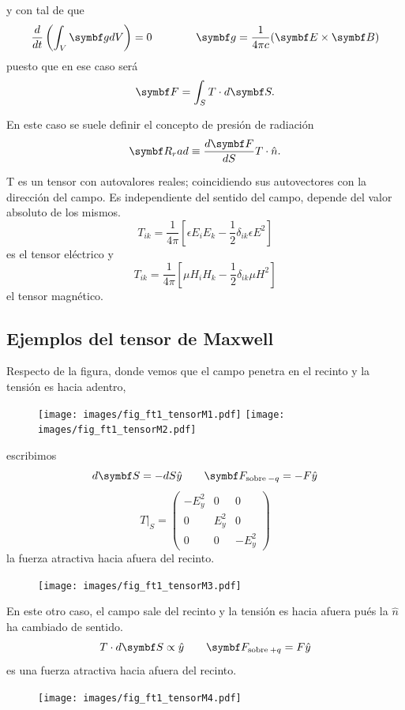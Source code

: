 \documentclass[10pt,oneside]{CBFT_book}
\begin{document}
y con tal de que 
\[
	\dtot{}{t}\left(\int_V \vb{g} dV \right) = 0 \qquad \qquad \vb{g} =  \frac{1}{4\pi c}(\pv{E}{B})
\]
puesto que en ese caso será
\[
	\vb{F} = \int_S T \cdot d\vb{S}.
\]

En este caso se suele definir el concepto de presión de radiación
\[
	\vb{R}_rad \equiv \dtot{\vb{F}}{S} T\cdot\hat{n}.
\]

T es un tensor con autovalores reales; coincidiendo sus autovectores con la dirección del campo.
Es independiente del sentido del campo, depende del valor absoluto de los mismos.
\[
	T_{ik} = \frac{1}{4\pi} \left[ \epsilon E_iE_k - \frac{1}{2}\delta_{ik} \epsilon E^2 \right] 
\]
es el tensor eléctrico y
\[
	T_{ik} = \frac{1}{4\pi} \left[ \mu H_iH_k - \frac{1}{2}\delta_{ik} \mu H^2  \right] 
\]
el tensor magnético.

\subsection{Ejemplos del tensor de Maxwell}

Respecto de la figura, donde vemos que el campo penetra en el recinto y la tensión es hacia adentro,
\begin{figure}[htb]
	\begin{center}
	\texttt{[image: images/fig\_ft1\_tensorM1.pdf]}
	\texttt{[image: images/fig\_ft1\_tensorM2.pdf]}	
	\end{center}
	\caption{}
\end{figure} 
escribimos 
\[
	d\vb{S} = -dS\hat{y} \qquad \vb{F}_{\text{sobre}\:-q} = -F\hat{y}
\]
\[
	T|_S = \begin{pmatrix}
	        -E_y^2	& 0 	& 0 \\
		0	& E_y^2	& 0 \\
		0	& 0	& -E_y^2
	       \end{pmatrix}
\]
la fuerza atractiva hacia afuera del recinto.
\begin{figure}[htb]
	\begin{center}
	\texttt{[image: images/fig\_ft1\_tensorM3.pdf]}	 
	\end{center}
	\caption{}
\end{figure} 

En este otro caso, el campo sale del recinto y la tensión es hacia afuera pués la $\hat{n}$
ha cambiado de sentido.
\[
	T\cdot d\vb{S} \propto \hat{y} \qquad \vb{F}_{\text{sobre}\:+q} = F\hat{y}
\]
es una fuerza atractiva hacia afuera del recinto.
\begin{figure}[htb]
	\begin{center}
	\texttt{[image: images/fig\_ft1\_tensorM4.pdf]}	 
	\end{center}
	\caption{}
\end{figure} 
\end{document}

